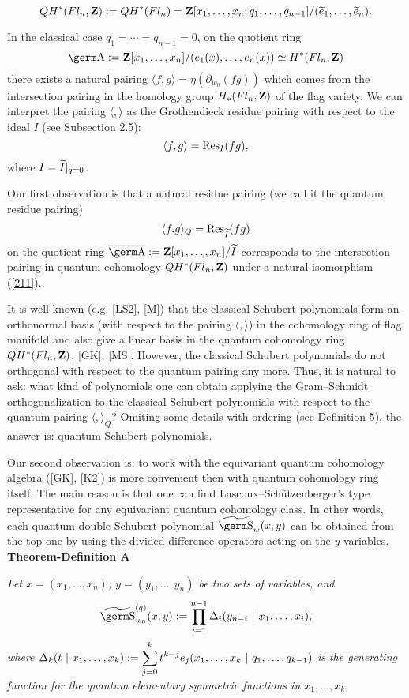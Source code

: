 {\begin{equation}QH^*(Fl_n,{\bf Z}):=QH^{\ast}(Fl_n) = {\bf Z}[x_1,\ldots ,x_n;q_1,
\ldots ,q_{n-1}]/(\widetilde e_1,\ldots ,\widetilde e_n). \label{211}
\end{equation}

In the classical case $q_1=\cdots =q_{n-1}=0$, on the quotient ring
$$\a :={\bf Z}[ x_1,\ldots ,x_n]/(e_1(x),\ldots ,e_n(x))\simeq 
H^*(Fl_n,{\bf Z})
$$
there exists a natural pairing $\langle f,g\rangle =\eta 
(\partial_{w_0}(fg))$ which comes from the intersection pairing in the
homology group $H_*(Fl_n,{\bf Z})$ of the flag variety. We can interpret
the pairing $\langle ,\rangle$ as the Grothendieck residue pairing with 
respect to the ideal $I$ (see Subsection 2.5):
$$\langle f,g\rangle =\hbox{\rm Res}_I(fg),
$$
where $I=\widetilde I|_{q=0}$.

Our first observation is that a natural residue pairing (we call it the
quantum residue pairing)
$$\langle f.g\rangle_Q=\hbox{\rm Res}_{\widetilde I}(fg)
$$
on the quotient ring $\overline{\a} :={\bf Z}[x_1,\ldots ,x_n]/\wt I$ 
corresponds to the intersection pairing in quantum cohomology 
$QH^*(Fl_n,{\bf Z})$ under a natural isomorphism (\ref{211}).

It is well-known (e.g. [LS2], [M]) that the classical Schubert polynomials
form an orthonormal basis (with respect to the pairing
$\langle ,\rangle$) in the cohomology ring of flag manifold and also
give a linear basis in the quantum cohomology ring $QH^*(Fl_n,{\bf Z})$,
[GK], [MS].
However, the classical Schubert polynomials do not orthogonal with respect
to the quantum pairing any more. Thus, it is natural to ask: what kind of
polynomials one can obtain applying the Gram--Schmidt orthogonalization 
to the classical Schubert polynomials with respect to the quantum pairing
$\langle ,\rangle_Q$? Omiting some details with ordering (see Definition 5),
the answer is: quantum Schubert polynomials.

Our second observation is: to work with the equivariant quantum
cohomology algebra ([GK], [K2]) is more convenient then with quantum 
cohomology ring itself.
The main reason is that one can 
find Lascoux--Sch\"utzenberger's type representative for any equivariant 
quantum cohomology class. In other words, each quantum double Schubert 
polynomial $\wt{\s}_w(x,y)$ can be obtained from the top one by using the 
divided difference operators acting on the $y$ variables. \medskip \\
{\bf Theorem-Definition A} \ {\it Let $x=(x_1,\ldots ,x_n)$, 
$y=(y_1,\ldots ,y_n)$ 
be two sets of variables, and
$$\wt{\s}_{w_0}^{(q)}(x,y):=\prod_{i=1}^{n-1}\Delta_i(y_{n-i}~|~x_1,\ldots 
,x_i),
$$
where $\Delta_k(t~|~x_1,\ldots 
,x_k):=\displaystyle\sum_{j=0}^kt^{k-j}e_j(x_1,\ldots ,x_k~|~q_1,\ldots ,q_{k-1})$
is the generating function for the quantum elementary symmetric functions 
in $x_1,\ldots ,x_k$.

}}
